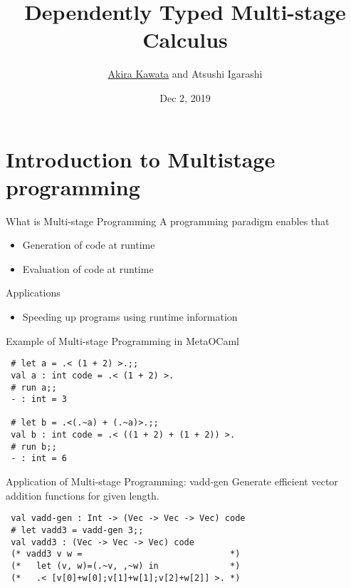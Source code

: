 \documentclass[dvipdfmx,aspectratio=169, 20pt]{beamer}
\title{Dependently Typed Multi-stage Calculus}
\author{\underline{Akira Kawata} and Atsushi Igarashi}
\institute{Graduate School of Informatics, Kyoto University}
\date{Dec 2, 2019}
\begin{document}
\maketitle


\section{Introduction to Multistage programming}

\begin{frame}[fragile]{What is Multi-stage Programming}
    A programming paradigm enables that
    \begin{itemize}
        \item Generation of code at runtime
        \item Evaluation of code at runtime
    \end{itemize}
    Applications
    \begin{itemize}
        \item Speeding up programs using runtime information
    \end{itemize}
    \note{
    }
\end{frame}

\begin{frame}[fragile]{Example of Multi-stage Programming in MetaOCaml}
    \begin{center}
        \begin{verbatim}
 # let a = .< (1 + 2) >.;;
 val a : int code = .< (1 + 2) >.
 # run a;;
 - : int = 3

 # let b = .<(.~a) + (.~a)>.;;
 val b : int code = .< ((1 + 2) + (1 + 2)) >. 
 # run b;;
 - : int = 6
        \end{verbatim}
    \end{center}
    \note{
    }
\end{frame}

\begin{frame}[fragile]{Application of Multi-stage Programming: vadd-gen}
    Generate efficient vector addition functions for given length.
    
    \begin{verbatim}
 val vadd-gen : Int -> (Vec -> Vec -> Vec) code
 # let vadd3 = vadd-gen 3;;
 val vadd3 : (Vec -> Vec -> Vec) code
 (* vadd3 v w =                             *)
 (*   let (v, w)=(.~v, ,~w) in              *)
 (*   .< [v[0]+w[0];v[1]+w[1];v[2]+w[2]] >. *)
    \end{verbatim}
    \note{
    }
\end{frame}
\end{document}

